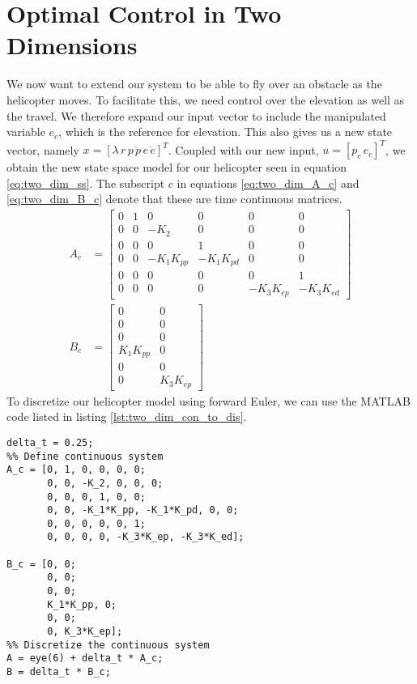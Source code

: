 \section{Optimal Control in Two Dimensions}\label{sec:two_dimensions}
We now want to extend our system to be able to fly over an obstacle as the helicopter moves. To facilitate this, we need control over the elevation as well as the travel. We therefore expand our input vector to include the manipulated variable $e_c$, which is the reference for elevation. This also gives us a new state vector, namely $x = [\lambda\, r\, p\, \dot{p}\, e\, \dot{e}]^T$. Coupled with our new input, $u = [p_c\, e_c]^T$, we obtain the new state space model for our helicopter seen in equation \ref{eq:two_dim_ss}. The subscript $c$ in equations \ref{eq:two_dim_A_c} and \ref{eq:two_dim_B_c} denote that these are time continuous matrices.
\begin{subequations}\label{eq:two_dim_ss}
\begin{align}
    \label{eq:two_dim_A_c}
    A_c &= \begin{bmatrix}
        0 & 1 & 0 & 0 & 0 & 0\\
        0 & 0 & -K_2 & 0 & 0 & 0\\
        0 & 0 & 0 & 1 & 0 & 0\\
        0 & 0 & -K_1K_{pp} & -K_1K_{pd} & 0 & 0\\
        0 & 0 & 0 & 0 & 0 & 1\\
        0 & 0 & 0 & 0 & -K_3K_{ep} & -K_3K_{ed}
    \end{bmatrix}\\
    \label{eq:two_dim_B_c}
    B_c &= \begin{bmatrix}
        0 & 0\\
        0 & 0\\
        0 & 0\\
        K_1K_{pp} & 0\\
        0 & 0\\
        0 & K_3K_{ep}
    \end{bmatrix}
\end{align}
\end{subequations}
To discretize our helicopter model using forward Euler, we can use the MATLAB code listed in listing \ref{lst:two_dim_con_to_dis}.
\begin{lstlisting}[caption=Discretization of the continuous model in equation \ref{eq:two_dim_ss}.,label=lst:two_dim_con_to_dis]
%% Time step size 0.25 seconds
delta_t = 0.25;
%% Define continuous system
A_c = [0, 1, 0, 0, 0, 0;
       0, 0, -K_2, 0, 0, 0;
       0, 0, 0, 1, 0, 0;
       0, 0, -K_1*K_pp, -K_1*K_pd, 0, 0;
       0, 0, 0, 0, 0, 1;
       0, 0, 0, 0, -K_3*K_ep, -K_3*K_ed];
   
B_c = [0, 0;
       0, 0;
       0, 0;
       K_1*K_pp, 0;
       0, 0;
       0, K_3*K_ep];
%% Discretize the continuous system
A = eye(6) + delta_t * A_c;
B = delta_t * B_c;
\end{lstlisting}

